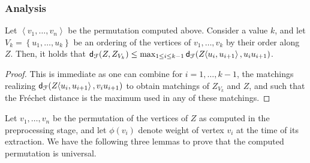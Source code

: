 \documentclass[12pt]{article}
\newcommand{\lemlab}[1]{\label{lemma:#1}}
\newcommand{\ts}{\hspace{0.6pt}}
\newcommand{\Frechet}{Fr\'{e}c{h}e{}t\xspace}\providecommand{\Arr}{\mathop{\mathrm{\EuScript{A}}}}
\newcommand{\distFr}[2]{\mathsf{d}_{\EuScript{F}}\pth{#1, #2}}
\newcommand{\cZ}{{Z}}
\providecommand{\pth}[2][\!]{#1\left({#2}\right)}
\providecommand{\brc}[1]{\left\{ {#1} \right\}}
\newcommand{\SC}[3]{{#1}\!\!\ts\ts \left\langle  #2, #3 \right\rangle}
\newcommand{\SpCrv}[2]{{#1}_{#2}}
\newcommand{\permut}[1]{\left\langle {#1} \right\rangle}
\newcommand{\vtxA}{u}
\newcommand{\vtxB}{v}
\newcommand{\weight}[1]{\ensuremath{\phi\pth{\vtx_{#1}}}}
\newcommand{\vtx}{\vtxB}
\newcommand{\segX}[2]{{#1}{#2}}
\numberwithin{figure}{section}
\numberwithin{equation}{section}
\newcommand{\matching}{matching\xspace}
\begin{document}
\subsubsection{Analysis}


\begin{lemma}\lemlab{spine:curve:f:r}Let $\permut{\vtx_1, \ldots, \vtx_n}$ be the permutation computed
    above. Consider a value $k$, and let $V_k = \brc{\vtxA_1, \ldots,
       \vtxA_k}$ be an ordering of the vertices of ${\vtx_1, \ldots,
       \vtx_k}$ by their order along $\cZ$. Then, it holds that
    $\distFr{\cZ}{\SpCrv{\cZ}{V_k}} \leq \max_{1 \leq i \leq k-1}
    \distFr{\SC{\cZ}{\vtxA_i}{\vtxA_{i+1}}}
    {\segX{\vtxA_i}{\vtxA_{i+1}}}$.
\end{lemma}
\begin{proof}
    This is immediate as one can combine for $i=1, \ldots, k-1$, the
    \matching{}s realizing $\distFr{\SC{\cZ}{\vtxA_i}{\vtxA_{i+1}}}
    {\segX{\vtx_i}{\vtxA_{i+1}}}$ to obtain \matching{}s of
    $\SpCrv{\cZ}{V_k}$ and $\cZ$, and such that the \Frechet distance
    is the maximum used in any of these \matching{}s.
\end{proof}


Let $\vtx_1,\dots,\vtx_n$ be the permutation of the vertices of $\cZ$
as computed in the preprocessing stage, and let $\weight{i}$ denote
weight of vertex $\vtx_i$ at the time of its extraction.  We have the
following three lemmas to prove that the computed permutation is
universal.
\end{document}
